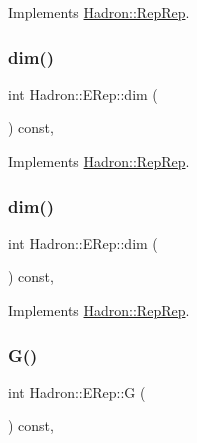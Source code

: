 Implements \mbox{\hyperlink{structHadron_1_1RepRep_a92c8802e5ed7afd7da43ccfd5b7cd92b}{Hadron\+::\+Rep\+Rep}}.

\mbox{\label{structHadron_1_1ERep_a9eba7fc8ee0562900e00c0755337f103}} 
\subsubsection{\texorpdfstring{dim()}{dim()}\hspace{0.1cm}{\footnotesize\ttfamily [4/5]}}
{\footnotesize\ttfamily int Hadron\+::\+E\+Rep\+::dim (\begin{DoxyParamCaption}{ }\end{DoxyParamCaption}) const\hspace{0.3cm}{\ttfamily [inline]}, {\ttfamily [virtual]}}



Implements \mbox{\hyperlink{structHadron_1_1RepRep_a92c8802e5ed7afd7da43ccfd5b7cd92b}{Hadron\+::\+Rep\+Rep}}.

\mbox{\label{structHadron_1_1ERep_a9eba7fc8ee0562900e00c0755337f103}} 
\subsubsection{\texorpdfstring{dim()}{dim()}\hspace{0.1cm}{\footnotesize\ttfamily [5/5]}}
{\footnotesize\ttfamily int Hadron\+::\+E\+Rep\+::dim (\begin{DoxyParamCaption}{ }\end{DoxyParamCaption}) const\hspace{0.3cm}{\ttfamily [inline]}, {\ttfamily [virtual]}}



Implements \mbox{\hyperlink{structHadron_1_1RepRep_a92c8802e5ed7afd7da43ccfd5b7cd92b}{Hadron\+::\+Rep\+Rep}}.

\mbox{\label{structHadron_1_1ERep_afc59abdfb3fdbbcddbe2dede52c570a6}} 
\subsubsection{\texorpdfstring{G()}{G()}\hspace{0.1cm}{\footnotesize\ttfamily [1/3]}}
{\footnotesize\ttfamily int Hadron\+::\+E\+Rep\+::G (\begin{DoxyParamCaption}{ }\end{DoxyParamCaption}) const\hspace{0.3cm}{\ttfamily [inline]}, {\ttfamily [virtual]}}

